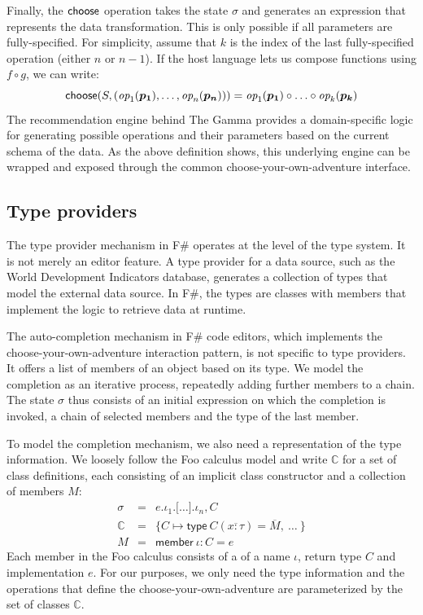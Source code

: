 \documentclass[anonymous, a4paper,UKenglish,cleveref, autoref, thm-restate]{lipics-v2021}
\newcommand{\ident}[1]{\textsf{#1}}
\newcommand{\select}{\textnormal{\ident{choose}}}
\newcommand{\op}{\textit{op}}
\begin{document}
Finally, the $\select$ operation takes the state $\sigma$ and generates an expression that represents
the data transformation. This is only possible if all parameters are fully-specified. For simplicity,
assume that $k$ is the index of the last fully-specified operation (either $n$ or $n-1$). If the
host language lets us compose functions using $f\circ g$, we can write:
\[
\select(S, (\op_1(\boldsymbol{p_1}), \ldots, \op_n(\boldsymbol{p_n}))) = \op_1(\boldsymbol{p_1}) \circ \ldots \circ \op_k(\boldsymbol{p_k})
\]
The recommendation engine behind The Gamma provides a domain-specific logic for generating
possible operations and their parameters based on the current schema of the data. As the above
definition shows, this underlying engine can be wrapped and exposed through the common
choose-your-own-adventure interface.


\subsection{Type providers}
\label{sec:examples-tps}

The type provider mechanism in F\# operates at the level of the type system. It is not merely an
editor feature. A type provider for a data source, such as the World Development Indicators database,
generates a collection of types that model the external data source. In F\#, the types are classes
with members that implement the logic to retrieve data at runtime.

The auto-completion mechanism in F\# code editors, which implements the choose-your-own-adventure
interaction pattern, is not specific to type providers. It offers a list of members of an object
based on its type. We model the completion as an iterative process, repeatedly adding further
members to a chain. The state $\sigma$ thus consists of an initial expression on which the
completion is invoked, a chain of selected members and the type of the last member.

To model the completion mechanism, we also need a representation of the type information. We loosely
follow the Foo calculus model \cite{petricek-2016-fsdata} and write $\mathbb{C}$ for a set
of class definitions, each consisting of an implicit class constructor and a collection of
members $M$:
\[
\begin{array}{rcl}
\sigma &=& e . \iota_1 . \lbrack\ldots\rbrack . \iota_n, C\\
\mathbb{C} &=& \{ C \mapsto \ident{type}~C(\overline{x:\tau}) = \overline{M},~\ldots~ \}\\
M &=& \ident{member}~\iota\!:\!C=e
\end{array}
\]
Each member in the Foo calculus consists of a of a name $\iota$, return type $C$ and implementation
$e$. For our purposes, we only need the type information and the operations that define the
choose-your-own-adventure are parameterized by the set of classes $\mathbb{C}$.
\end{document}
